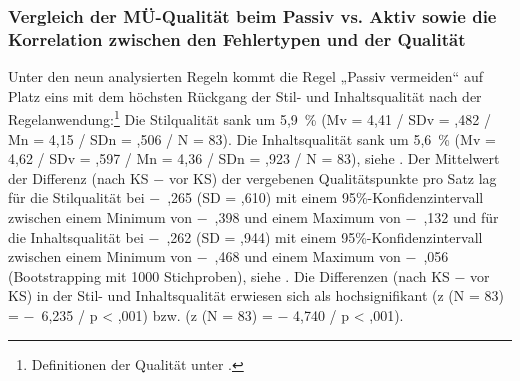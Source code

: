 \subsubsection{\label{sec:5.3.6.4}Vergleich der MÜ-Qualität beim Passiv vs. Aktiv sowie die Korrelation zwischen den Fehlertypen und der Qualität}

Unter den neun analysierten Regeln kommt die Regel „Passiv vermeiden“ auf Platz eins mit dem höchsten Rückgang der Stil- und Inhaltsqualität nach der Regelanwendung:\footnote{\textrm{Definitionen der Qualität unter .}} Die Stilqualität sank um 5,9~\% (Mv = 4,41 / SDv = ,482 / Mn = 4,15 / SDn = ,506 / N = 83). Die Inhaltsqualität sank um 5,6~\% (Mv = 4,62 / SDv = ,597 / Mn = 4,36 / SDn = ,923 / N = 83), siehe . Der Mittelwert der Differenz (nach KS $-$ vor KS) der vergebenen Qualitätspunkte pro Satz lag für die Stilqualität bei $-$~,265 (SD = ,610) mit einem 95\%\nobreakdash-Konfidenzintervall zwischen einem Minimum von $-$~,398 und einem Maximum von $-$~,132 und für die Inhaltsqualität bei $-$~,262 (SD = ,944) mit einem 95\%\nobreakdash-Konfidenzintervall zwischen einem Minimum von $-$~,468 und einem Maximum von $-$~,056 (Bootstrapping mit 1000 Stichproben), siehe . Die Differenzen (nach KS $-$ vor KS) in der Stil- und Inhaltsqualität erwiesen sich als hochsignifikant (z (N = 83) = $-$~6,235 / p < ,001) bzw. (z (N = 83) = $-$ 4,740 / p < ,001).

